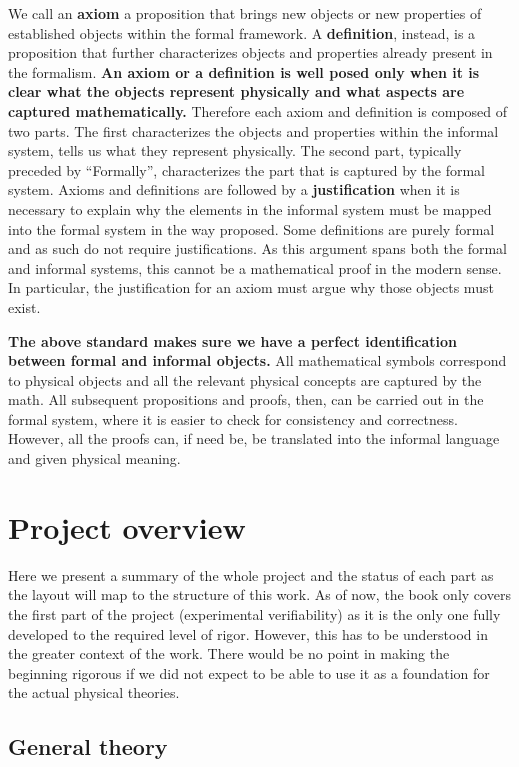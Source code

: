 \documentclass[11pt,letterpaper,fleqn]{memoir} %
\begin{document}
We call an \textbf{axiom} a proposition that brings new objects or new properties of established objects within the formal framework. A \textbf{definition}, instead, is a proposition that further characterizes objects and properties already present in the formalism. \textbf{An axiom or a definition is well posed only when it is clear what the objects represent physically and what aspects are captured mathematically.} Therefore each axiom and definition is composed of two parts. The first characterizes the objects and properties within the informal system, tells us what they represent physically. The second part, typically preceded by ``Formally'', characterizes the part that is captured by the formal system. Axioms and definitions are followed by a \textbf{justification} when it is necessary to explain why the elements in the informal system must be mapped into the formal system in the way proposed. Some definitions are purely formal and as such do not require justifications. As this argument spans both the formal and informal systems, this cannot be a mathematical proof in the modern sense. In particular, the justification for an axiom must argue why those objects must exist.

\textbf{The above standard makes sure we have a perfect identification between formal and informal objects.} All mathematical symbols correspond to physical objects and all the relevant physical concepts are captured by the math. All subsequent propositions and proofs, then, can be carried out in the formal system, where it is easier to check for consistency and correctness. However, all the proofs can, if need be, be translated into the informal language and given physical meaning.

\section{Project overview}

Here we present a summary of the whole project and the status of each part as the layout will map to the structure of this work. As of now, the book only covers the first part of the project (experimental verifiability) as it is the only one fully developed to the required level of rigor. However, this has to be understood in the greater context of the work. There would be no point in making the beginning rigorous if we did not expect to be able to use it as a foundation for the actual physical theories.

\subsection{General theory}
\end{document}
